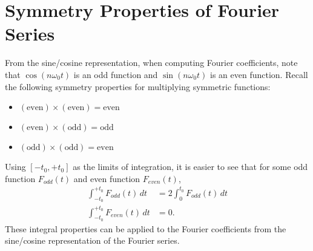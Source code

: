 \documentclass{report}
\begin{document}
\newpage
\section{Symmetry Properties of Fourier Series}
From the sine/cosine representation, when computing Fourier coefficients, note that $\cos(n\omega_0 t)$ is an odd function and $\sin(n\omega_0 t)$ is an even function. 
Recall the following symmetry properties for multiplying symmetric functions:
\begin{itemize}
    \item $(\text{even}) \times (\text{even}) = \text{even}$
    \item $(\text{even}) \times (\text{odd}) = \text{odd}$
    \item $(\text{odd}) \times (\text{odd}) = \text{even}$
\end{itemize}
Using $[-t_0, +t_0]$ as the limits of integration, it is easier to see that for some odd function $F_{odd}(t)$ and even function $F_{even}(t)$,
\begin{align}
    \int_{-t_0}^{+t_0} F_{odd}(t) \,dt &= 2\int_{0}^{t_0} F_{odd}(t) \,dt \\
    \int_{-t_0}^{+t_0} F_{even}(t) \,dt &= 0.
\end{align}
These integral properties can be applied to the Fourier coefficients from the sine/cosine representation of the Fourier series.
\end{document}

